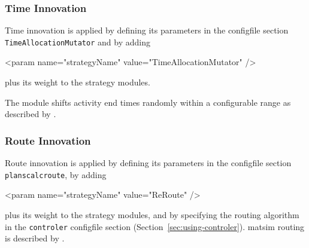 
\subsubsection{Time Innovation}
\label{sec:timechoice}
Time innovation is applied by defining its parameters in the \gls{configfile} section \lstinline|TimeAllocationMutator| and by adding 
%
\begin{xml}
	<param name="strategyName" value="TimeAllocationMutator" />
\end{xml}
%
plus its weight to the strategy modules.

The module shifts activity end times randomly within a configurable range as described by \citet[][]{BalmerRaneyEtAl2005act-times, Raney_PhDThesis_2005, Balmer_unpub_VSP_2004, BalmerEtAl_unpub_EIRASS_2004, BalmerEtAl_unpub_STRC_2004}. %

\subsubsection{Route Innovation}
\label{sec:routechoice}

Route innovation is applied by defining its parameters in the \gls{configfile} section \lstinline|planscalcroute|, by adding 
%
\begin{xml}
	<param name="strategyName" value="ReRoute" />
\end{xml}
%
plus its weight to the strategy modules, and by specifying the routing algorithm in the \lstinline|controler| \gls{configfile} section (Section~\ref{sec:using-controler}).
\gls{matsim} routing is described by \citet[]{LefebvreBalmer_unpub_STRC_2007}. 

%

